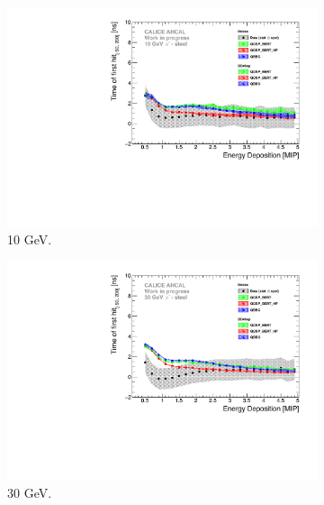 \begin{figure}[htbp!]
	\begin{subfigure}[t]{0.5\textwidth}
		\centering
		\includegraphics[width=1\textwidth]{chap5/fig_AHCAL_timing/Pions/ComparisonToSim/Time_Energy_10GeV.pdf}
		\caption{10 GeV.} \label{fig:Energy_SimData_10GeV}
	\end{subfigure}
	\hfill
	\begin{subfigure}[t]{0.5\textwidth}
		\centering
		\includegraphics[width=1\textwidth]{chap5/fig_AHCAL_timing/Pions/ComparisonToSim/Time_Energy_30GeV.pdf}
		\caption{30 GeV.}\label{fig:Energy_SimData_30GeV}
	\end{subfigure}
	\begin{subfigure}[t]{0.5\textwidth}
		\centering

\end{subfigure}
\end{figure}

